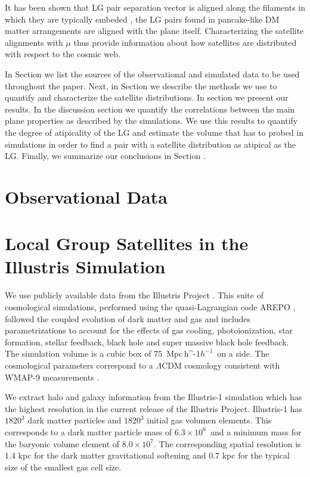 \documentclass[a4paper,fleqn,usenatbib]{mnras}
\newcommand{\Mpch}{\,{\rm Mpc}\,\ifmmode h^{-1}\else $h^{-1}$\fi}
\newcommand{\Msun}{{\ifmmode{{\rm{M_{\odot}}}}\else{${\rm{M_{\odot}}}$}\fi}}
\begin{document}
 
It has been shown that LG pair separation vector is aligned along the
filaments in  which they are typically embeded
\cite{2015ApJ...799...45F}, the LG pairs found in pancake-like DM
matter arrangements are aligned with the plane itself. 
Characterizing the satellite alignments with $\mu$ thus provide
information about how satellites are distributed with respect to the
cosmic web. 

In Section we list the sources of the observational and
simulated data to be used throughout the paper.
Next, in Section we describe the methods we use to quantify and
characterize the satellite distributions.
In section we present our results. 
In the discussion section we quantify the correlations between the main
plane properties as described by the simulations.
We use this results to quantify the degree of atipicality of the LG
and estimate the volume that has to probed in simulations in order to
find a pair with a satellite distribution as atipical as the LG. 
Finally, we summarize our conclusions in Section .


\section{Observational Data}
\label{sec:obs}


\section{Local Group Satellites in the Illustris Simulation}
\label{sec:NumericalSetup}

We use publicly available data from the Illustris Project 
\citep{2014MNRAS.444.1518V}. 
This suite of cosmological simulations, performed using the quasi-Lagrangian
code AREPO \citep{2010MNRAS.401..791S}, followed the coupled evolution of dark 
matter and gas and includes parametrizations to account for the effects of
gas cooling, photoionization, star formation, stellar feedback, black
hole and super massive black hole feedback. 
The simulation volume is a cubic box of $75$ \Mpch\ on a side.
The cosmological parameters correspond to a $\Lambda$CDM cosmology
consistent with WMAP-9 measurements \citep{2013ApJS..208...19H}. 

We extract halo and galaxy information from the Illustris-1 simulation
which has the highest resolution in the current release of the
Illustris Project.
Illustris-1 has $1820^3$ dark matter particles and $1820^3$ initial gas
volumen elements. 
This corresponds to a dark matter particle mass of
$6.3\times 10^6$\Msun\ and a minimum mass for the baryonic volume
element of $8.0\times 10^7$\Msun. 
The corresponding spatial resolution is $1.4$ kpc for the dark matter
gravitational softening and $0.7$ kpc for the typical size of the
smallest gas cell size. 
\end{document}
